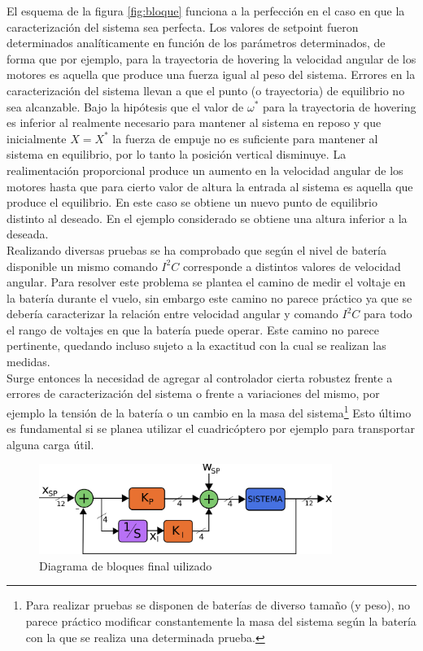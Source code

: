 \documentclass[main]{subfiles}
\begin{document}
El esquema de la figura \ref{fig:bloque} funciona a la perfecci\'on en el caso en que la caracterizaci\'on del sistema sea perfecta. Los valores de setpoint fueron determinados anal\'iticamente en funci\'on de los par\'ametros determinados, de forma que por ejemplo, para la trayectoria de hovering la velocidad angular de los motores es aquella que produce una fuerza igual al peso del sistema. Errores en la caracterizaci\'on del sistema llevan a que el punto (o trayectoria) de equilibrio no sea alcanzable. Bajo la hip\'otesis que el valor de $\omega^*$ para la trayectoria de hovering es inferior al realmente necesario para mantener al sistema en reposo y que inicialmente $X = X^*$ la fuerza de empuje no es suficiente para mantener al sistema en equilibrio, por lo tanto la posici\'on vertical disminuye. La realimentaci\'on proporcional produce un aumento en la velocidad angular de los motores hasta que para cierto valor de altura la entrada al sistema es aquella que produce el equilibrio. En este caso se obtiene un nuevo punto de equilibrio distinto al deseado. En el ejemplo considerado se obtiene una altura inferior a la deseada. \\

Realizando diversas pruebas se ha comprobado que seg\'un el nivel de bater\'ia disponible un mismo comando $I^2C$ corresponde a distintos valores de velocidad angular. Para resolver este problema se plantea el camino de medir el voltaje en la bater\'ia durante el vuelo, sin embargo este camino no parece pr\'actico ya que se deber\'ia caracterizar la relaci\'on entre velocidad angular y comando $I^2C$ para todo el rango de voltajes en que la bater\'ia puede operar. Este camino no parece pertinente, quedando incluso sujeto a la exactitud con la cual se realizan las medidas.\\

Surge entonces la necesidad de agregar al controlador cierta robustez frente a errores de caracterizaci\'on del sistema o frente a variaciones del mismo, por ejemplo la tensi\'on de la bater\'ia o un cambio en la masa del sistema\footnote{Para realizar pruebas se disponen de bater\'ias de diverso tamaño (y peso), no parece pr\'actico modificar constantemente la masa del sistema seg\'un la bater\'ia con la que se realiza una determinada prueba.} Esto \'ultimo es fundamental si se planea utilizar el cuadric\'optero por ejemplo para transportar alguna carga \'util.\\

\begin{figure}[h!]
	\centering
	\vspace{-20pt}
	\includegraphics[width=0.85\textwidth]{./pics_control/diagrama_bloques_completo.png}
	\caption{Diagrama de bloques final uilizado}
	\label{fig:bloque2}
\end{figure}
\end{document}
